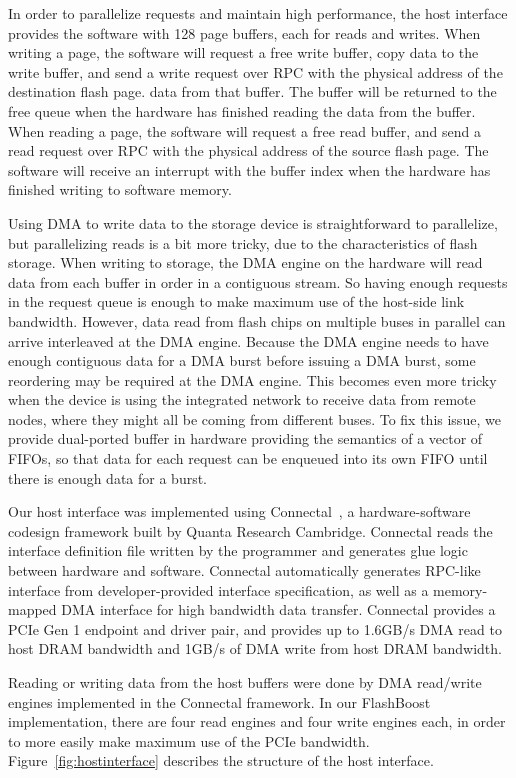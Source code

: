 In order to parallelize requests and maintain high performance, the host
interface provides the software with 128 page buffers, each for reads and
writes. When writing a page, the software will request a free write buffer, copy
data to the write buffer, and send a write request over RPC with the
physical address of the destination flash page.
data from that buffer. The buffer will be returned to the free queue when the
hardware has finished reading the data from the buffer. When reading a page, the
software will request a free read buffer, and send a read request over RPC with
the physical address of the source flash page. The software will receive an
interrupt with the buffer index when the hardware has finished writing to
software memory.

Using DMA to write data to the storage device is straightforward to parallelize,
but parallelizing reads is a bit more tricky, due to the characteristics of flash
storage. When writing to storage, the DMA engine on the hardware will read data
from each buffer in order in a contiguous stream. So having enough requests in
the request queue is enough to make maximum use of the host-side link bandwidth.
However, data read from flash chips on multiple buses in parallel can arrive
interleaved at the DMA engine. Because the DMA engine needs to have enough
contiguous data for a DMA burst before issuing a DMA burst, some reordering may
be required at the DMA engine. This becomes even more tricky when the device is
using the integrated network to receive data from remote nodes, where they might
all be coming from different buses. To fix this issue, we provide dual-ported
buffer in hardware providing the semantics of a vector of FIFOs, so that data
for each request can be enqueued into its own FIFO until there is enough data
for a burst.

Our host interface was implemented using Connectal~\cite{connectal}, a
hardware-software codesign framework built by Quanta Research Cambridge.
Connectal reads the interface definition file written by the programmer and
generates glue logic between hardware and software. Connectal automatically
generates RPC-like interface from developer-provided interface specification, as
well as a memory-mapped DMA interface for high bandwidth data transfer.
Connectal provides a PCIe Gen 1 endpoint and driver pair, and provides up to
1.6GB/s DMA read to host DRAM bandwidth and 1GB/s of DMA write from host DRAM
bandwidth. 

Reading or writing data from the host buffers were done by DMA read/write
engines implemented in the Connectal framework. In our FlashBoost
implementation, there are four read engines and four write engines each, in
order to more easily make maximum use of the PCIe bandwidth. 
Figure~\ref{fig:hostinterface} describes the structure of the host
interface.

